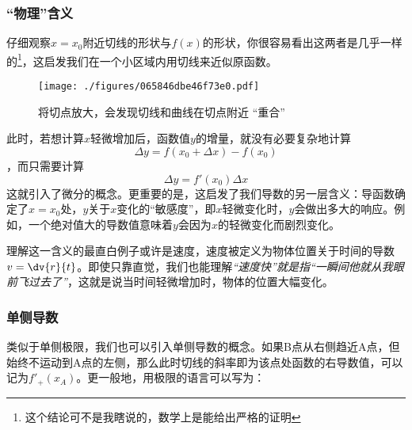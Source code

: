 \subsubsection{“物理”含义}
仔细观察$x=x_0$附近切线的形状与$f(x)$的形状，你很容易看出这两者是几乎一样的\footnote{这个结论可不是我瞎说的，数学上是能给出严格的证明}，这启发我们在一个小区域内用切线来近似原函数。

\begin{figure}[ht]
\centering
\texttt{[image: ./figures/065846dbe46f73e0.pdf]}
\caption{将切点放大，会发现切线和曲线在切点附近 “重合”}\label{fig_Der_1}
\end{figure}

此时，若想计算$x$轻微增加后，函数值$y$的增量，就没有必要复杂地计算
$$\Delta y = f(x_0+\Delta x) - f(x_0)$$
，而只需要计算
\begin{equation}
\Delta y = f'(x_0) \Delta x
\end{equation}
这就引入了微分的概念。更重要的是，这启发了我们导数的另一层含义：导函数确定了$x=x_0$处，$y$关于$x$变化的“敏感度”，即$x$轻微变化时，$y$会做出多大的响应。例如，一个绝对值大的导数值意味着$y$会因为$x$的轻微变化而剧烈变化。

理解这一含义的最直白例子或许是速度，速度被定义为物体位置关于时间的导数$v=\dv{r}{t}$。即使只靠直觉，我们也能理解\textsl{“速度快”就是指“一瞬间他就从我眼前飞过去了”}，这就是说当时间轻微增加时，物体的位置大幅变化。


\subsubsection{单侧导数}
类似于单侧极限，我们也可以引入单侧导数的概念。如果B点从右侧趋近A点，但始终不运动到A点的左侧，那么此时切线的斜率即为该点处函数的右导数值，可以记为$f'_+(x_A)$。更一般地，用极限的语言可以写为：

